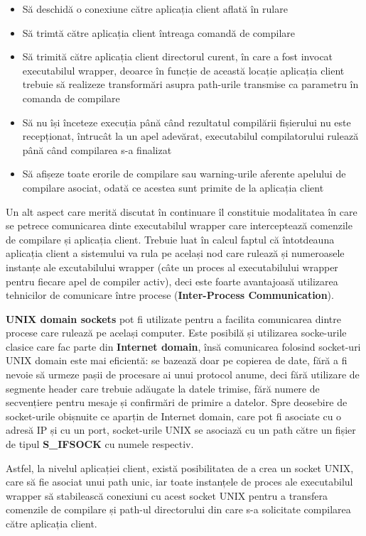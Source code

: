 \begin{itemize}
    \item Să deschidă o conexiune către aplicația client aflată în rulare
    \item Să trimtă către aplicația client întreaga comandă de compilare
    \item Să trimită către aplicația client directorul curent, în care a fost invocat executabilul wrapper, deoarce în funcție 
    de această locație aplicația client trebuie să realizeze transformări asupra path-urile transmise ca parametru în comanda
    de compilare
    \item Să nu își înceteze execuția până când rezultatul compilării fișierului nu este recepționat, întrucât la un apel adevărat,
    executabilul compilatorului rulează până când compilarea s-a finalizat
    \item Să afișeze toate erorile de compilare sau warning-urile aferente apelului de compilare asociat, odată ce acestea
    sunt primite de la aplicația client
\end{itemize}

Un alt aspect care merită discutat în continuare îl constituie modalitatea în care se petrece comunicarea dinte executabilul wrapper
care interceptează comenzile de compilare și aplicația client. Trebuie luat în calcul faptul că întotdeauna aplicația client a sistemului va 
rula pe același nod care rulează și numeroasele instanțe ale excutabilului wrapper (câte un proces al executabilului wrapper pentru fiecare
apel de compiler activ), deci este foarte avantajoasă utilizarea tehnicilor de comunicare între procese (\textbf{Inter-Process Communication}).

\textbf{UNIX domain sockets}\cite{stevens2013advanced} pot fi utilizate pentru a facilita comunicarea dintre procese care rulează pe același computer. Este posibilă și
utilizarea socke-urile clasice care fac parte din \textbf{Internet domain}, însă comunicarea folosind socket-uri UNIX domain este mai eficientă:
se bazează doar pe copierea de date, fără a fi nevoie să urmeze pașii de procesare ai unui protocol anume, deci fără utilizare de segmente header
care trebuie adăugate la datele trimise, fără numere de secvențiere pentru mesaje și confirmări de primire a datelor. Spre deosebire de socket-urile
obișnuite ce aparțin de Internet domain, care pot fi asociate cu o adresă IP și cu un port, socket-urile UNIX se asociază
cu un path către un fișier de tipul \textbf{S\_IFSOCK} cu numele respectiv.

Astfel, la nivelul aplicației client, există posibilitatea de a crea un socket UNIX, care să fie asociat unui path unic, iar toate instanțele
de proces ale executabilul wrapper să stabilească conexiuni cu acest socket UNIX pentru a transfera comenzile de compilare și path-ul 
directorului din care s-a solicitate compilarea către aplicația client.

